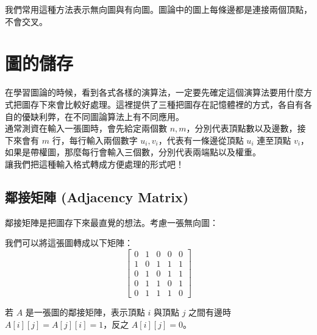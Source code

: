 我們常用這種方法表示無向圖與有向圖。圖論中的圖上每條邊都是連接兩個頂點，不會交叉。

\section{圖的儲存}
在學習圖論的時候，看到各式各樣的演算法，一定要先確定這個演算法要用什麼方式把圖存下來會比較好處理。這裡提供了三種把圖存在記憶體裡的方式，各自有各自的優缺利弊，在不同圖論算法上有不同應用。\\

通常測資在輸入一張圖時，會先給定兩個數 $n, m$，分別代表頂點數以及邊數，接下來會有 $m$ 行，每行輸入兩個數字 $u_i, v_i$，代表有一條邊從頂點 $u_i$ 連至頂點 $v_i$，如果是帶權圖，那麼每行會輸入三個數，分別代表兩端點以及權重。\\

讓我們把這種輸入格式轉成方便處理的形式吧！

\subsection{鄰接矩陣 (Adjacency Matrix)}
鄰接矩陣是把圖存下來最直覺的想法。考慮一張無向圖：
\begin{center}
\end{center}

我們可以將這張圖轉成以下矩陣：
\begin{displaymath}
\begin{bmatrix}
0 & 1 & 0 & 0 & 0\\
1 & 0 & 1 & 1 & 1\\
0 & 1 & 0 & 1 & 1\\
0 & 1 & 1 & 0 & 1\\
0 & 1 & 1 & 1 & 0
\end{bmatrix}
\end{displaymath}

若 $A$ 是一張圖的鄰接矩陣，表示頂點 $i$ 與頂點 $j$ 之間有邊時 $A[i][j] = A[j][i] = 1$，反之 $A[i][j] = 0$。\\


